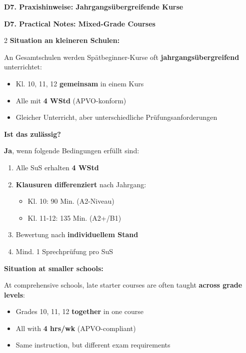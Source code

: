 \documentclass[10pt,a4paper]{article}
\newcommand{\secbil}[2]{%
\vspace{6pt}
\noindent\colorbox{spaet}{\parbox{0.48\textwidth}{\color{white}\bfseries\small #1}}%
\hfill%
\colorbox{english}{\parbox{0.48\textwidth}{\color{white}\bfseries\small #2}}
\vspace{3pt}
}
\begin{document}
\secbil{D7. Praxishinweise: Jahrgangsübergreifende Kurse}{D7. Practical Notes: Mixed-Grade Courses}

\vspace{2mm}

\begin{paracol}{2}
\small
\textbf{Situation an kleineren Schulen:}\footnotemark[17]

An Gesamtschulen werden Spätbeginner-Kurse oft \textbf{jahrgangsübergreifend} unterrichtet:
\begin{itemize}[noitemsep,topsep=2pt]
\item Kl. 10, 11, 12 \textbf{gemeinsam} in einem Kurs
\item Alle mit \textbf{4 WStd} (APVO-konform)
\item Gleicher Unterricht, aber unterschiedliche Prüfungsanforderungen
\end{itemize}

\textbf{Ist das zulässig?}

\textbf{Ja}, wenn folgende Bedingungen erfüllt sind:
\begin{enumerate}[noitemsep,topsep=2pt]
\item Alle SuS erhalten \textbf{4 WStd}
\item \textbf{Klausuren differenziert} nach Jahrgang:
\begin{itemize}[noitemsep,topsep=1pt]
\item[-] Kl. 10: 90 Min. (A2-Niveau)
\item[-] Kl. 11-12: 135 Min. (A2+/B1)
\end{itemize}
\item Bewertung nach \textbf{individuellem Stand}
\item Mind. 1 Sprechprüfung pro SuS
\end{enumerate}

\switchcolumn

\small\color{english}
\textbf{Situation at smaller schools:}\footnotemark[17]

At comprehensive schools, late starter courses are often taught \textbf{across grade levels}:
\begin{itemize}[noitemsep,topsep=2pt]
\item Grades 10, 11, 12 \textbf{together} in one course
\item All with \textbf{4 hrs/wk} (APVO-compliant)
\item Same instruction, but different exam requirements
\end{itemize}


\end{paracol}
\end{document}
